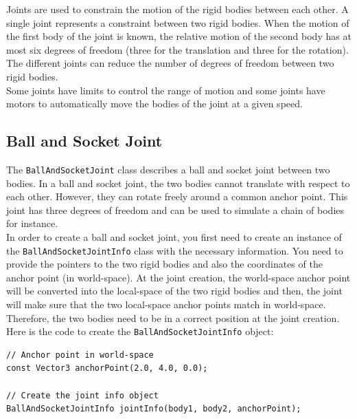 \documentclass[a4paper,12pt]{article}
\begin{document}
    Joints are used to constrain the motion of the rigid bodies between each other. A single joint represents a constraint between two rigid bodies.
    When the motion of the first body of the joint is known, the relative motion of the second body has at most six degrees of freedom (three for the
    translation and three for the rotation). The different joints can reduce the number of degrees of freedom between two rigid bodies. \\

    Some joints have limits to control the range of motion and some joints have motors to automatically move the bodies of the joint at a given speed. \\

    \subsection{Ball and Socket Joint}

    The \texttt{BallAndSocketJoint} class describes a ball and socket joint between two bodies. In a ball and socket joint, the two bodies cannot translate with respect to each other.
    However, they can rotate freely around a common anchor point. This joint has three degrees of freedom and can be used to simulate a chain of bodies for instance. \\

    In order to create a ball and socket joint, you first need to create an instance of the \texttt{BallAndSocketJointInfo} class with the necessary information. You need to provide the pointers to the
    two rigid bodies and also the coordinates of the anchor point (in world-space). At the joint creation, the world-space anchor point will be converted into the local-space of the two rigid
    bodies and then, the joint will make sure that the two local-space anchor points match in world-space. Therefore, the two bodies need to be in a correct position at the joint creation. \\

    Here is the code to create the \texttt{BallAndSocketJointInfo} object: \\

    \begin{lstlisting}
// Anchor point in world-space
const Vector3 anchorPoint(2.0, 4.0, 0.0);

// Create the joint info object
BallAndSocketJointInfo jointInfo(body1, body2, anchorPoint);
  \end{lstlisting}
\end{document}
